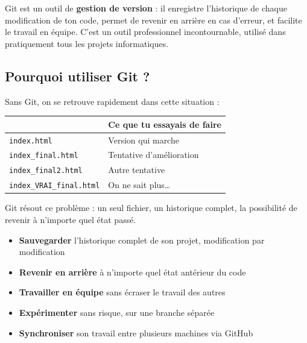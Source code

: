 \documentclass[a4paper,11pt]{article}
\newcommand{\hdr}[1]{\multicolumn{1}{l}{\color{white}\bfseries #1}}
\renewcommand{\arraystretch}{1.3}
\begin{document}
Git est un outil de \textbf{gestion de version} : il enregistre l'historique de chaque modification de ton code, permet de revenir en arrière en cas d'erreur, et facilite le travail en équipe. C'est un outil professionnel incontournable, utilisé dans pratiquement tous les projets informatiques.

\subsection{Pourquoi utiliser Git ?}

Sans Git, on se retrouve rapidement dans cette situation :

\begin{center}
\renewcommand{\arraystretch}{1.0}
\begin{tabularx}{\linewidth}{p{5cm}X}
  \toprule
  \rowcolor{uniNavy}
  \hdr{Fichier} &  \hdr{Ce que tu essayais de faire} \\
  \midrule
  \rowcolor{uniPaper}
  \texttt{index.html} & Version qui marche \\
  \texttt{index\_final.html} & Tentative d'amélioration \\
  \rowcolor{uniPaper}
  \texttt{index\_final2.html} & Autre tentative \\
  \texttt{index\_VRAI\_final.html} & On ne sait plus\ldots \\
  \bottomrule
\end{tabularx}
\end{center}

\vspace{6pt}
Git résout ce problème : un seul fichier, un historique complet, la possibilité de revenir à n'importe quel état passé.

\begin{tcolorbox}[definition, title={Ce que Git permet de faire}]
\begin{itemize}
  \item \textbf{Sauvegarder} l'historique complet de son projet, modification par modification
  \item \textbf{Revenir en arrière} à n'importe quel état antérieur du code
  \item \textbf{Travailler en équipe} sans écraser le travail des autres
  \item \textbf{Expérimenter} sans risque, sur une branche séparée
  \item \textbf{Synchroniser} son travail entre plusieurs machines via GitHub
\end{itemize}
\end{tcolorbox}
\end{document}
